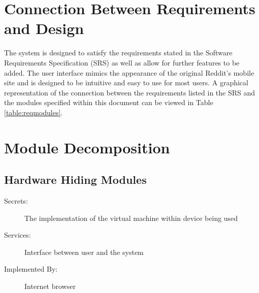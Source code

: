 \documentclass[12pt,fleqn]{article}
\begin{document}
\section{Connection Between Requirements and Design} \label{sec:connection}

The system is designed to satisfy the requirements stated in the Software Requirements Specification (SRS) as well as allow for further features to be added. The user interface mimics the appearance of the original Reddit's mobile site and is designed to be intuitive and easy to use for most users. A graphical representation of the connection between the requirements listed in the SRS and the modules specified within this document can be viewed in Table \ref{table:reqmodules}.

\section{Module Decomposition} \label{sec:md}





\subsection{Hardware Hiding Modules}

\begin{description}
\item[Secrets:] The implementation of the virtual machine within device being used
\item[Services:]Interface between user and the system
\item[Implemented By:] Internet browser
\end{description}
\end{document}
